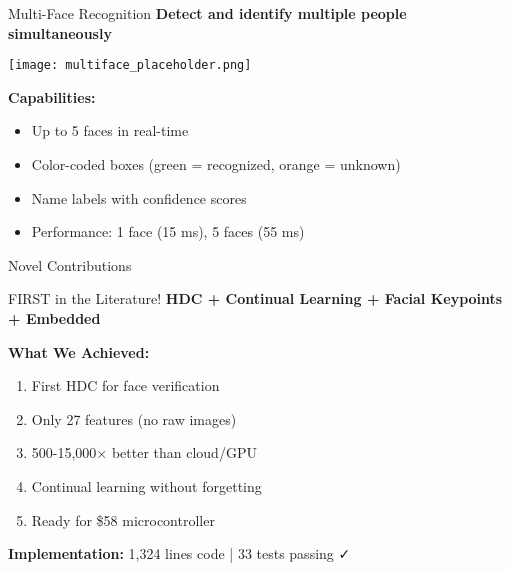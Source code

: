 \documentclass[aspectratio=169]{beamer}
\begin{document}
\begin{frame}{Multi-Face Recognition}
\textbf{Detect and identify multiple people simultaneously}

\begin{center}
\texttt{[image: multiface\_placeholder.png]}
\end{center}

\textbf{Capabilities:}
\begin{itemize}
    \item Up to 5 faces in real-time
    \item Color-coded boxes (green = recognized, orange = unknown)
    \item Name labels with confidence scores
    \item Performance: 1 face (15 ms), 5 faces (55 ms)
\end{itemize}
\end{frame}

\begin{frame}{Novel Contributions}
\begin{block}{FIRST in the Literature!}
\textbf{HDC + Continual Learning + Facial Keypoints + Embedded}
\end{block}

\textbf{What We Achieved:}
\begin{enumerate}
    \item {} First HDC for face verification
    \item {} Only 27 features (no raw images)
    \item {} 500-15,000× better than cloud/GPU
    \item {} Continual learning without forgetting
    \item {} Ready for \$58 microcontroller
\end{enumerate}

\vspace{1em}
\textbf{Implementation:} 1,324 lines code | 33 tests passing ✓
\end{frame}
\end{document}
